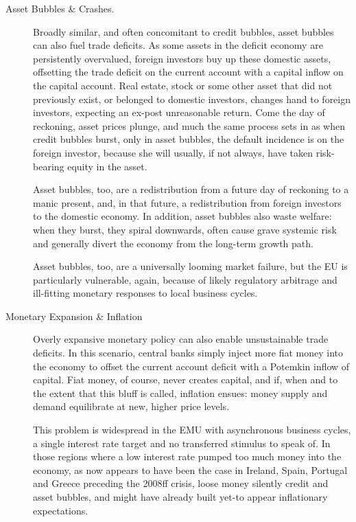 \documentclass[11pt,a4paper,oneside,openright]{article}
\begin{document}
\begin{description}
	\item[Asset Bubbles \& Crashes.] Broadly similar, and often concomitant to credit bubbles, asset bubbles can also fuel trade deficits. 
	As some assets in the deficit economy are persistently overvalued, foreign investors buy up these domestic assets, offsetting the trade deficit on the current account with a capital inflow on the capital account. 
	Real estate, stock or some other asset that did not previously exist, or belonged to domestic investors, changes hand to foreign investors, expecting an ex-post unreasonable return. 
	Come the day of reckoning, asset prices plunge, and much the same process sets in as when credit bubbles burst, only in asset bubbles, the default incidence is on the foreign investor, because she will usually, if not always, have taken risk-bearing equity in the asset. 
	
	Asset bubbles, too, are a redistribution from a future day of reckoning to a manic present, and, in that future, a redistribution from foreign investors to the domestic economy. 
	In addition, asset bubbles also waste welfare: 
	when they burst, they spiral downwards, often cause grave systemic risk and generally divert the economy from the long-term growth path.
	
	Asset bubbles, too, are a universally looming market failure, but the \gls{EU} is particularly vulnerable, again, because of likely regulatory arbitrage and ill-fitting monetary responses to local business cycles.%
	
	\item[Monetary Expansion \& Inflation] Overly expansive monetary policy can also enable unsustainable trade deficits. 
	In this scenario, central banks simply inject more fiat money into the economy to offset the current account deficit with a Potemkin inflow of capital. 
	Fiat money, of course, never creates capital, and if, when and to the extent that this bluff is called, inflation ensues: 
	money supply and demand equilibrate at new, higher price levels. 
	
	This problem is widespread in the \gls{EMU} with asynchronous business cycles, a single interest rate target and no transferred stimulus to speak of. 
	In those regions where a low interest rate pumped too much money into the economy, as now appears to have been the case in Ireland, Spain, Portugal and Greece preceding the 2008ff crisis, loose money silently credit and asset bubbles, and might have already built yet-to appear inflationary expectations. %
	

\end{description}
\end{document}
